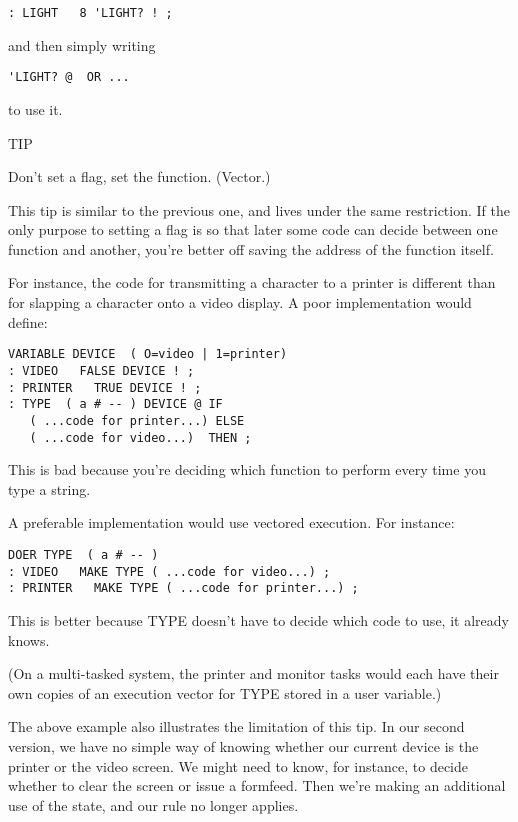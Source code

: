 \begin{verbatim}
: LIGHT   8 'LIGHT? ! ;
\end{verbatim}

and then simply writing

\begin{verbatim}
'LIGHT? @  OR ...
\end{verbatim}

to use it.

TIP

Don't set a flag, set the function. (Vector.)

This tip is similar to the previous one, and lives under the same
restriction. If the only purpose to setting a flag is so that later some
code can decide between one function and another, you're better off saving
the address of the function itself.

For instance, the code for transmitting a character to a printer is
different than for slapping a character onto a video display. A poor
implementation would define:

\begin{verbatim}
VARIABLE DEVICE  ( O=video | 1=printer)
: VIDEO   FALSE DEVICE ! ;
: PRINTER   TRUE DEVICE ! ;
: TYPE  ( a # -- ) DEVICE @ IF
   ( ...code for printer...) ELSE
   ( ...code for video...)  THEN ;
\end{verbatim}

This is bad because you're deciding which function to perform every time
you type a string.

A preferable implementation would use vectored execution. For
instance:

\begin{verbatim}
DOER TYPE  ( a # -- )
: VIDEO   MAKE TYPE ( ...code for video...) ;
: PRINTER   MAKE TYPE ( ...code for printer...) ;
\end{verbatim}

This is better because TYPE doesn't have to decide which code to use, it
already knows.

(On a multi-tasked system, the printer and monitor tasks would
each have their own copies of an execution vector for TYPE
stored in a user variable.)

The above example also illustrates the limitation of this tip. In our
second version, we have no simple way of knowing whether our current
device is the printer or the video screen. We might need to know, for
instance, to decide whether to clear the screen or issue a formfeed. Then
we're making an additional use of the state, and our rule no longer
applies.

